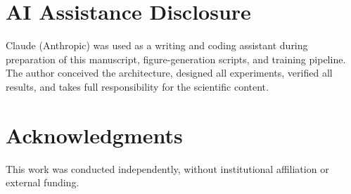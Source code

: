 \section*{AI Assistance Disclosure}

Claude (Anthropic) was used as a writing and coding assistant during preparation of this manuscript,
figure-generation scripts, and training pipeline. The author conceived the architecture, designed all
experiments, verified all results, and takes full responsibility for the scientific content.

\section*{Acknowledgments}

This work was conducted independently, without institutional affiliation or external funding.

